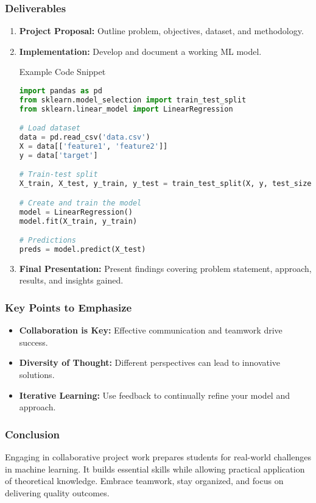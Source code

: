 \documentclass[aspectratio=169]{beamer}
\begin{document}
\begin{frame}[fragile]
    \frametitle{Deliverables}
    \begin{enumerate}
        \item \textbf{Project Proposal:} Outline problem, objectives, dataset, and methodology.
        \item \textbf{Implementation:} Develop and document a working ML model.
        \begin{block}{Example Code Snippet}
        \begin{lstlisting}[language=Python]
import pandas as pd
from sklearn.model_selection import train_test_split
from sklearn.linear_model import LinearRegression

# Load dataset
data = pd.read_csv('data.csv')
X = data[['feature1', 'feature2']]
y = data['target']

# Train-test split
X_train, X_test, y_train, y_test = train_test_split(X, y, test_size=0.2, random_state=42)

# Create and train the model
model = LinearRegression()
model.fit(X_train, y_train)

# Predictions
preds = model.predict(X_test)
        \end{lstlisting}
        \end{block}
        \item \textbf{Final Presentation:} Present findings covering problem statement, approach, results, and insights gained.
    \end{enumerate}
\end{frame}

\begin{frame}
    \frametitle{Key Points to Emphasize}
    \begin{itemize}
        \item \textbf{Collaboration is Key:} Effective communication and teamwork drive success.
        \item \textbf{Diversity of Thought:} Different perspectives can lead to innovative solutions.
        \item \textbf{Iterative Learning:} Use feedback to continually refine your model and approach.
    \end{itemize}
\end{frame}

\begin{frame}
    \frametitle{Conclusion}
    Engaging in collaborative project work prepares students for real-world challenges in machine learning. It builds essential skills while allowing practical application of theoretical knowledge. Embrace teamwork, stay organized, and focus on delivering quality outcomes.
\end{frame}
\end{document}
